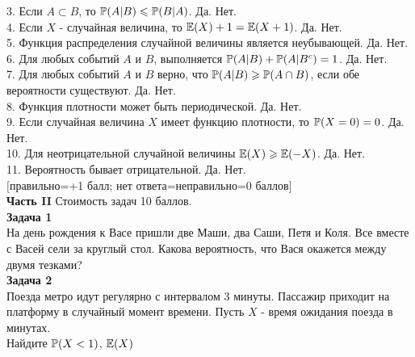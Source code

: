\documentclass[pdftex,12pt,a4paper]{article}
\begin{document}
3. Если $A\subset B$, то $\P(A|B)\le \P(B|A)$. Да. Нет. \\

4. Если  $X$  - случайная величина, то $\E(X)+1=\E(X+1)$. Да. Нет. \\

5. Функция распределения случайной величины является неубывающей. Да. Нет. \\

6. Для любых событий $A$ и $B$, выполняется $\P(A|B)+\P(A|B^{c})=1$. Да. Нет. \\

7. Для любых событий  $A$  и  $B$  верно, что $\P(A|B)\ge \P(A\cap
B)$, если обе вероятности существуют. Да. Нет. \\

8. Функция плотности может быть периодической. Да. Нет. \\

9. Если случайная величина $X$ имеет функцию плотности, то $\P(X=0)=0$. Да. Нет. \\

10. Для неотрицательной случайной величины $\E(X)\ge \E(-X)$. Да.
Нет. \\

11. Вероятность бывает отрицательной. Да. Нет. \\


$[$правильно=+1 балл; нет ответа=неправильно=0 баллов$]$ \\




\pagebreak \textbf{Часть II} Стоимость задач 10 баллов. \\


\textbf{Задача 1} \\ %
На день рождения к Васе пришли две Маши, два Саши, Петя и Коля. Все вместе с Васей сели за круглый стол. Какова вероятность, что Вася окажется между двумя тезками? \\


\textbf{Задача 2} \\ %
Поезда метро идут регулярно с интервалом 3 минуты. Пассажир
приходит на платформу в случайный момент времени. Пусть $X$ -
время ожидания поезда в минутах. \\
Найдите $\P(X<1)$, $\E(X)$ \\

\end{document}
